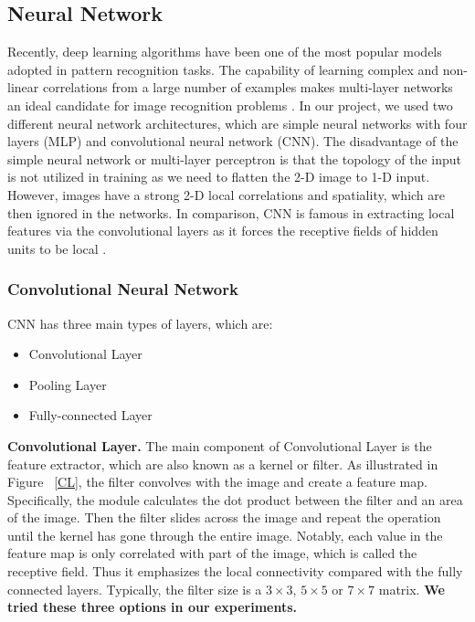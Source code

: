 \documentclass{article}
\begin{document}
\subsection{Neural Network} \label{nn}
Recently, deep learning algorithms have been one of the most popular models adopted in pattern recognition tasks. The capability of learning complex and non-linear correlations from a large number of examples makes multi-layer networks an ideal candidate for image recognition problems \cite{Lecun1998}. In our project, we used two different neural network architectures, which are simple neural networks with four layers (MLP) and convolutional neural network (CNN). The disadvantage of the simple neural network or multi-layer perceptron is that the topology of the input is not utilized in training as we need to flatten the 2-D image to 1-D input. However, images have a strong 2-D local correlations and spatiality, which are then ignored in the networks. In comparison, CNN is famous in extracting local features via the convolutional layers as it forces the receptive fields of hidden units to be local \cite{Lecun1998}. 

\subsubsection{Convolutional Neural Network}
CNN  has three main types of layers, which are:
\begin{itemize}
    \item Convolutional Layer
    \item Pooling Layer
    \item Fully-connected Layer
\end{itemize}

\textbf{Convolutional Layer. }
The main component of Convolutional Layer is the feature extractor, which are also known as a kernel or filter. As illustrated in Figure ~\ref{CL}, the filter convolves with the image and create a feature map. Specifically, the module calculates the dot product between the filter and an area of the image. Then the filter slides across the image and repeat the operation until the kernel has gone through the entire image. Notably, each value in the feature map is only correlated with part of the image, which is called the receptive field. Thus it emphasizes the local connectivity compared with the fully connected layers\cite{ibmconv}. Typically, the filter size is a $3 \times 3$, $5 \times 5$ or $7 \times 7$ matrix. \textbf{We tried these three options in our experiments.}
\end{document}
